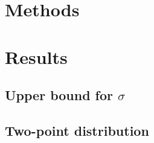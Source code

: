 \documentclass{scrreprt}
\begin{document}
\section{Methods}

  

\section{Results}

  \subsection*{Upper bound for $\sigma$}

    

  \subsection*{Two-point distribution}  

    
    
\end{document}
